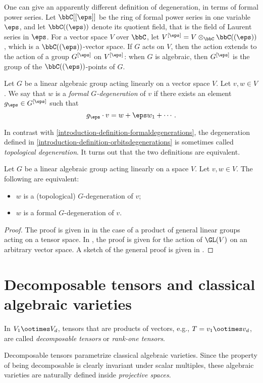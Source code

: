 One can give an apparently different definition of degeneration, in terms of formal power series. Let $\bbC[[\eps]]$ be the ring of formal power series in one variable $\eps$, and let $\bbC((\eps))$ denote its quotient field, that is the field of Laurent series in $\eps$. For a vector space $V$ over $\bbC$, let $V^{[\eps]} = V \otimes_{\bbC} \bbC((\eps))$, which is a $\bbC((\eps))$-vector space. If $G$ acts on $V$, then the action extends to the action of a group $G^{[\eps]}$ on $V^{[\eps]}$: when $G$ is algebraic, then $G^{[\eps]}$ is the group of the $\bbC((\eps))$-points of $G$. 
\begin{definition}
\label{introduction-definition-formaldegenerations}
Let $G$ be a linear algebraic group acting linearly on a vector space $V$. Let $v,w \in V$. We say that $w$ is a \emph{formal $G$-degeneration} of $v$ if there exists an element $g_\eps \in G^{[\eps]}$ such that
\[
g_\eps \cdot v = w + \eps w_1 + \cdots .
\]
\end{definition}
In contrast with \ref{introduction-definition-formaldegenerations}, the degeneration defined in \ref{introduction-definition-orbitsdegenerations} is sometimes called \emph{topological degeneration}. It turns out that the two definitions are equivalent.
\begin{theorem}
\label{introduction-theorem-degenerationsequivalence}
Let $G$ be a linear algebraic group acting linearly on a space $V$. Let $v,w \in V$. The following are equivalent:
\begin{itemize}
 \item $w$ is a (topological) $G$-degeneration of $v$;
 \item $w$ is a formal $G$-degeneration of $v$.
\end{itemize}
\end{theorem}
\begin{proof}
The proof is given in \cite[Sec.20.6]{BCS97} in the case of a product of general linear groups acting on a tensor space. In \cite[Sec.2.3]{Kra84}, the proof is given for the action of $\GL(V)$ on an arbitrary vector space. A sketch of the general proof is given in \cite[Rmk.4.4]{CGZ23}.
\end{proof}

\section{Decomposable tensors and classical algebraic varieties}
\label{introduction-section-decomposable_tensors}
\begin{definition}\label{introduction-definition-decomposable_tensor}
    In $V_1\ootimes V_d$, tensors that are products of vectors, e.g., $T = v_1 \ootimes v_d$, are called \emph{decomposable tensors} or \emph{rank-one tensors}.
\end{definition}
Decomposable tensors parametrize classical algebraic varieties. Since the property of being decomposable is clearly invariant under scalar multiples, these algebraic varieties are naturally defined inside \emph{projective spaces}.

